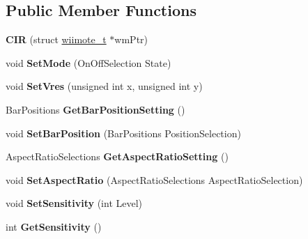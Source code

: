 \subsection*{\-Public \-Member \-Functions}
\begin{DoxyCompactItemize}
\item 
\hypertarget{class_c_i_r_aa57f492413ae0ab3b89df2132333c8aa}{{\bfseries \-C\-I\-R} (struct \hyperlink{structwiimote__t}{wiimote\-\_\-t} $\ast$wm\-Ptr)}\label{class_c_i_r_aa57f492413ae0ab3b89df2132333c8aa}

\item 
\hypertarget{class_c_i_r_a4c5e1930758120afa38ce8f4404c0cad}{void {\bfseries \-Set\-Mode} (\-On\-Off\-Selection \-State)}\label{class_c_i_r_a4c5e1930758120afa38ce8f4404c0cad}

\item 
\hypertarget{class_c_i_r_a55843dbe557db2a246b72a820d4feb2f}{void {\bfseries \-Set\-Vres} (unsigned int x, unsigned int y)}\label{class_c_i_r_a55843dbe557db2a246b72a820d4feb2f}

\item 
\hypertarget{class_c_i_r_a234cdafc9ba4f8c71d079be4b628037e}{\-Bar\-Positions {\bfseries \-Get\-Bar\-Position\-Setting} ()}\label{class_c_i_r_a234cdafc9ba4f8c71d079be4b628037e}

\item 
\hypertarget{class_c_i_r_a2f53ec4a1467018e7f87e7656e41b973}{void {\bfseries \-Set\-Bar\-Position} (\-Bar\-Positions \-Position\-Selection)}\label{class_c_i_r_a2f53ec4a1467018e7f87e7656e41b973}

\item 
\hypertarget{class_c_i_r_ab66706c98e35632fa825fb51bd40239b}{\-Aspect\-Ratio\-Selections {\bfseries \-Get\-Aspect\-Ratio\-Setting} ()}\label{class_c_i_r_ab66706c98e35632fa825fb51bd40239b}

\item 
\hypertarget{class_c_i_r_a086af52543a75cdba5434a57b1846edb}{void {\bfseries \-Set\-Aspect\-Ratio} (\-Aspect\-Ratio\-Selections \-Aspect\-Ratio\-Selection)}\label{class_c_i_r_a086af52543a75cdba5434a57b1846edb}

\item 
\hypertarget{class_c_i_r_a4144e2d3d037de5cd2da3d53d11f1a83}{void {\bfseries \-Set\-Sensitivity} (int \-Level)}\label{class_c_i_r_a4144e2d3d037de5cd2da3d53d11f1a83}

\item 
\hypertarget{class_c_i_r_a2898d4e3967661a04b93246f4dda4a40}{int {\bfseries \-Get\-Sensitivity} ()}\label{class_c_i_r_a2898d4e3967661a04b93246f4dda4a40}


\end{DoxyCompactItemize}
